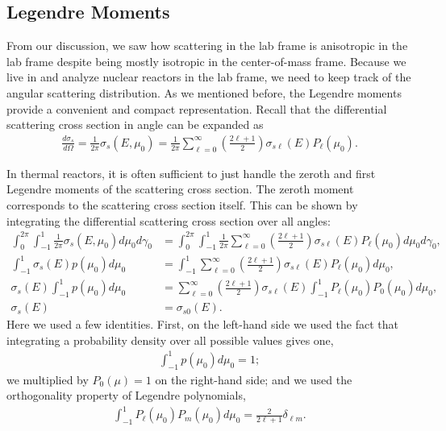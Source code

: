 \subsection{Legendre Moments}

From our discussion, we saw how scattering in the lab frame is anisotropic in the lab frame despite being mostly isotropic in the center-of-mass frame. Because we live in and analyze nuclear reactors in the lab frame, we need to keep track of the angular scattering distribution. As we mentioned before, the Legendre moments provide a convenient and compact representation. Recall that the differential scattering cross section in angle can be expanded as
\begin{align}
  \frac{d\sigma_s}{d\Omega} = \frac{1}{2\pi} \sigma_s(E,\mu_0) = \frac{1}{2\pi} \sum_{\ell=0}^\infty \left( \frac{2\ell + 1}{2} \right) \sigma_{s\ell}(E) P_\ell(\mu_0) .
\end{align}

In thermal reactors, it is often sufficient to just handle the zeroth and first Legendre moments of the scattering cross section. The zeroth moment corresponds to the scattering cross section itself. This can be shown by integrating the differential scattering cross section over all angles:
\begin{align}
   \int_0^{2\pi} \int_{-1}^1 \frac{1}{2\pi} \sigma_s(E,\mu_0) d\mu_0 d\gamma_0 &= 
   \int_0^{2\pi} \int_{-1}^1 \frac{1}{2\pi} \sum_{\ell=0}^\infty \left( \frac{2\ell + 1}{2} \right) \sigma_{s\ell}(E) P_\ell(\mu_0) d\mu_0 d\gamma_0 , \nonumber \\
   \int_{-1}^1 \sigma_s(E) p(\mu_0) d\mu_0 &= \int_{-1}^1 \sum_{\ell=0}^\infty \left( \frac{2\ell + 1}{2} \right) \sigma_{s\ell}(E) P_\ell(\mu_0) d\mu_0 , \nonumber \\
    \sigma_s(E) \int_{-1}^1  p(\mu_0) d\mu_0 &=  \sum_{\ell=0}^\infty \left( \frac{2\ell + 1}{2} \right) \sigma_{s\ell}(E) \int_{-1}^1 P_\ell(\mu_0) P_0(\mu_0) d\mu_0 , \nonumber \\  
    \sigma_s(E) &= \sigma_{s0}(E)  .
\end{align}
Here we used a few identities. First, on the left-hand side we used the fact that integrating a probability density over all possible values gives one,
\begin{align}
  \int_{-1}^1 p(\mu_0) d\mu_0 = 1 ; \nonumber
\end{align}
we multiplied by $P_0(\mu) = 1$ on the right-hand side; and we used the orthogonality property of Legendre polynomials,
\begin{align}
  \int_{-1}^1 P_\ell(\mu_0) P_m(\mu_0) d\mu_0 = \frac{ 2 }{ 2 \ell + 1 } \delta_{\ell m} . \nonumber
\end{align}

